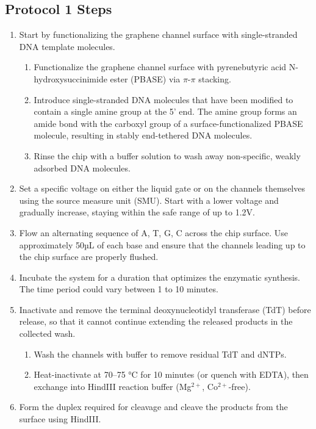 \documentclass[11pt]{article}
\begin{document}
\subsection*{Protocol 1 Steps}
\begin{enumerate}
    \item Start by functionalizing the graphene channel surface with single-stranded DNA template molecules.
    \begin{enumerate} %
        \item Functionalize the graphene channel surface with pyrenebutyric acid N-hydroxysuccinimide ester (PBASE) via $\pi$-$\pi$ stacking.
        \item Introduce single-stranded DNA molecules that have been modified to contain a single amine group at the 5’ end. The amine group forms an amide bond with the carboxyl group of a surface-functionalized PBASE molecule, resulting in stably end-tethered DNA molecules.
        \item Rinse the chip with a buffer solution to wash away non-specific, weakly adsorbed DNA molecules.
    \end{enumerate}
    \item Set a specific voltage on either the liquid gate or on the channels themselves using the source measure unit (SMU). Start with a lower voltage and gradually increase, staying within the safe range of up to 1.2V.
    \item Flow an alternating sequence of A, T, G, C across the chip surface. Use approximately 50µL of each base and ensure that the channels leading up to the chip surface are properly flushed.
    \item Incubate the system for a duration that optimizes the enzymatic synthesis. The time period could vary between 1 to 10 minutes.
    \item Inactivate and remove the terminal deoxynucleotidyl transferase (TdT) before release, so that it cannot continue extending the released products in the collected wash.
    \begin{enumerate} %
        \item Wash the channels with buffer to remove residual TdT and dNTPs.
        \item Heat-inactivate at 70--75 °C for 10 minutes (or quench with EDTA), then exchange into HindIII reaction buffer (Mg$^{2+}$, Co$^{2+}$-free).
    \end{enumerate}
    \item Form the duplex required for cleavage and cleave the products from the surface using HindIII.

\end{enumerate}
\end{document}
